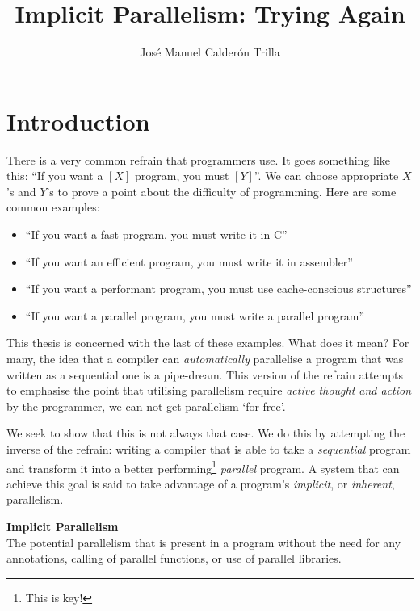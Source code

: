 \documentclass[justified]{tufte-book}
\title{Implicit Parallelism: Trying Again}
\author{Jos\'{e} Manuel Calder\'{o}n Trilla}
\newcommand{\blankpage}{\newpage\hbox{}\thispagestyle{empty}\newpage}
\newcommand{\defineword}[2]{%
\begin{description}%
    \item{\textbf{#1}} \hfill \\%
        {#2}%
\end{description}%
}
\begin{document}
\frontmatter


\maketitle

\tableofcontents
\listoffigures
\listoftables

\chapter{Introduction}

    There is a very common refrain that programmers use. It goes something like
    this: ``If you want a $[X]$ program, you must $[Y]$''. We can choose
    appropriate $X$'s and $Y$'s to prove a point about the difficulty of
    programming. Here are some common examples:

    \begin{itemize}
      \item ``If you want a fast program, you must write it in C''
      \item ``If you want an efficient program, you must write it in
                assembler''
      \item ``If you want a performant program, you must use
                cache-conscious structures''
      \item ``If you want a parallel program, you must write a parallel
                program''
    \end{itemize}

    This thesis is concerned with the last of these examples. What does it mean?
    For many, the idea that a compiler can \emph{automatically} parallelise a
    program that was written as a sequential one is a pipe-dream. This version
    of the refrain attempts to emphasise the point that utilising parallelism
    require \emph{active thought and action} by the programmer, we can not
    get parallelism `for free'.
    
    We seek to show that this is not always that case. We do this by attempting
    the inverse of the refrain: writing a compiler that is able to take a
    \emph{sequential} program and transform it into a better
    performing\footnote{This is key!} \emph{parallel} program.  A system that
    can achieve this goal is said to take advantage of a program's
    \emph{implicit}, or \emph{inherent}, parallelism.

    \defineword{Implicit Parallelism}{The potential parallelism that is present
        in a program without the need for any annotations, calling of parallel
        functions, or use of parallel libraries.}
    
\end{document}
